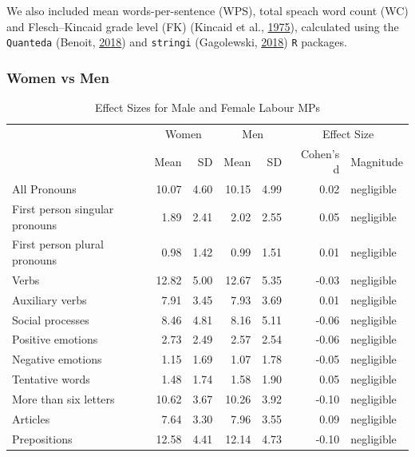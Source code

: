 \documentclass[]{article}
\begin{document}
We also included mean words-per-sentence (WPS), total speach word count
(WC) and Flesch--Kincaid grade level (FK) (Kincaid et al.,
\protect\hyperlink{ref-kincaid1975}{1975}), calculated using the
\texttt{Quanteda} (Benoit, \protect\hyperlink{ref-benoit2018}{2018}) and
\texttt{stringi} (Gagolewski,
\protect\hyperlink{ref-gagolewski2018}{2018}) \texttt{R} packages.

\hypertarget{women-vs-men}{%
\subsubsection{Women vs Men}\label{women-vs-men}}

\begin{table}

\caption{\label{tab:gender-effect-sizes-table}Effect Sizes for Male and Female Labour MPs}
\centering
\begin{tabular}[t]{lrrrrrl}
\toprule
\multicolumn{1}{c}{ } & \multicolumn{2}{c}{Women} & \multicolumn{2}{c}{Men} & \multicolumn{2}{c}{Effect Size} \\
\cmidrule(l{2pt}r{2pt}){2-3} \cmidrule(l{2pt}r{2pt}){4-5} \cmidrule(l{2pt}r{2pt}){6-7}
 & Mean & SD & Mean & SD & Cohen's d & Magnitude\\
\midrule
All Pronouns & 10.07 & 4.60 & 10.15 & 4.99 & 0.02 & negligible\\
First person singular pronouns & 1.89 & 2.41 & 2.02 & 2.55 & 0.05 & negligible\\
First person plural pronouns & 0.98 & 1.42 & 0.99 & 1.51 & 0.01 & negligible\\
Verbs & 12.82 & 5.00 & 12.67 & 5.35 & -0.03 & negligible\\
Auxiliary verbs & 7.91 & 3.45 & 7.93 & 3.69 & 0.01 & negligible\\
\addlinespace
Social processes & 8.46 & 4.81 & 8.16 & 5.11 & -0.06 & negligible\\
Positive emotions & 2.73 & 2.49 & 2.57 & 2.54 & -0.06 & negligible\\
Negative emotions & 1.15 & 1.69 & 1.07 & 1.78 & -0.05 & negligible\\
Tentative words & 1.48 & 1.74 & 1.58 & 1.90 & 0.05 & negligible\\
More than six letters & 10.62 & 3.67 & 10.26 & 3.92 & -0.10 & negligible\\
\addlinespace
Articles & 7.64 & 3.30 & 7.96 & 3.55 & 0.09 & negligible\\
Prepositions & 12.58 & 4.41 & 12.14 & 4.73 & -0.10 & negligible\\

\end{tabular}
\end{table}
\end{document}

